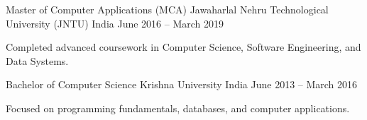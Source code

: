 
\begin{cventries}

  \cventry
    {Master of Computer Applications (MCA)} %
    {Jawaharlal Nehru Technological University (JNTU)} %
    {India} %
    {June 2016 -- March 2019} %
    {
      \begin{cvitems} %
        \item {Completed advanced coursework in Computer Science, Software Engineering, and Data Systems.}
      \end{cvitems}
    }

  \cventry
    {Bachelor of Computer Science} %
    {Krishna University} %
    {India} %
    {June 2013 -- March 2016} %
    {
      \begin{cvitems} %
        \item {Focused on programming fundamentals, databases, and computer applications.}
      \end{cvitems}
    }

\end{cventries}
